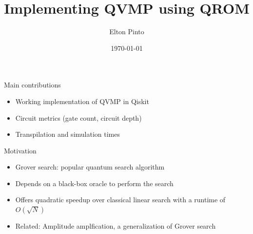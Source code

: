 \documentclass[10pt]{beamer}
\title{Implementing QVMP using QROM}
\author{Elton Pinto}
\date{\today}
\begin{document}
\begin{frame}[plain]
\titlepage
\end{frame}



  
\begin{frame}{Main contributions}
  \begin{itemize}
    \item Working implementation of QVMP in Qiskit
    \item Circuit metrics (gate count, circuit depth)
    \item Transpilation and simulation times
  \end{itemize}
\end{frame}

\begin{frame}{Motivation}
  \begin{itemize}
    \item Grover search: popular quantum search algorithm
    \item Depends on a black-box oracle to perform the search
    \item Offers quadratic speedup over classical linear search with a
      runtime of $O(\sqrt{N})$
    \item Related: Amplitude amplfication, a generalization of Grover search
  \end{itemize}
\end{frame}
\end{document}
